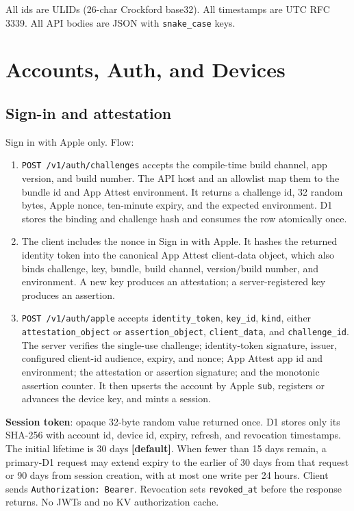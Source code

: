 \documentclass[11pt]{article}
\newcommand{\code}[1]{\texttt{#1}}
\begin{document}
All ids are ULIDs (26-char Crockford base32). All timestamps are UTC RFC 3339. All
API bodies are JSON with \code{snake\_case} keys.

\section{Accounts, Auth, and Devices}

\subsection{Sign-in and attestation}

Sign in with Apple only. Flow:

\begin{enumerate}[nosep]
  \item \code{POST /v1/auth/challenges} accepts the compile-time build channel,
        app version, and build number. The API host and an allowlist map them to the
        bundle id and App Attest environment. It returns a challenge id, 32 random
        bytes, Apple nonce, ten-minute expiry, and the expected environment. D1
        stores the binding and challenge hash and consumes the row atomically once.
  \item The client includes the nonce in Sign in with Apple. It hashes the returned
        identity token into the canonical App Attest client-data object, which also
        binds challenge, key, bundle, build channel, version/build number, and
        environment. A new key produces an attestation; a server-registered key
        produces an assertion.
  \item \code{POST /v1/auth/apple} accepts \code{identity\_token},
        \code{key\_id}, \code{kind}, either \code{attestation\_object} or
        \code{assertion\_object}, \code{client\_data}, and \code{challenge\_id}.
        The server verifies the single-use challenge; identity-token signature,
        issuer, configured client-id audience, expiry, and nonce; App Attest app id
        and environment; the attestation or assertion signature; and the monotonic
        assertion counter. It then upserts the account by Apple \code{sub},
        registers or advances the device key, and mints a session.
\end{enumerate}

\textbf{Session token}: opaque 32-byte random value returned once. D1 stores only
its SHA-256 with account id, device id, expiry, refresh, and revocation timestamps.
The initial lifetime is 30 days \textbf{[default]}. When fewer than 15 days remain, a
primary-D1 request may extend expiry to the earlier of 30 days from that request or 90
days from session creation, with at most one write per 24 hours. Client sends
\code{Authorization: Bearer}.
Revocation sets \code{revoked\_at} before the response returns. No JWTs and no KV
authorization cache.
\end{document}
